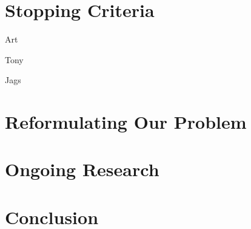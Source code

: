\documentclass{svproc}
\begin{document}
\section{Stopping Criteria} \label{sec:stop}
Art

Tony

Jags

\section{Reformulating Our Problem} \label{sec:reformulate}
\section{Ongoing Research} \label{sec:onging}
\section{Conclusion} \label{sec:conclusion}





\end{document}
